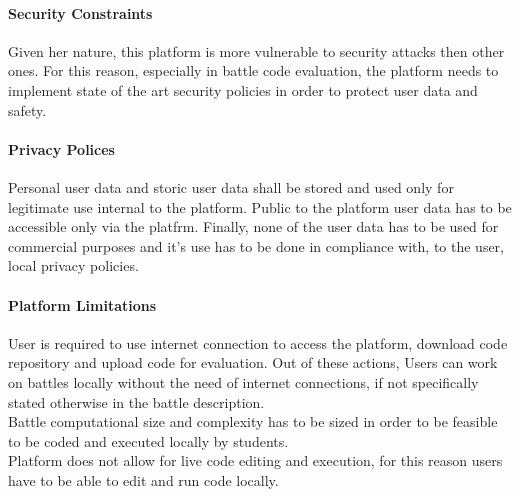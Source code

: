 \paragraph{Security Constraints}
Given her nature, this platform is more vulnerable to security attacks then other ones. For this reason, especially in battle code evaluation, the platform needs to implement state of the art security policies in order to protect user data and safety.
\paragraph{Privacy Polices}
Personal user data and storic user data shall be stored and used only for legitimate use internal to the platform. Public to the platform user data has to be accessible only via the platfrm. Finally, none of the user data has to be used for commercial purposes and it's use has to be done in compliance with, to the user, local privacy policies. 
\paragraph{Platform Limitations}
User is required to use internet connection to access the platform, download code repository and upload code for evaluation. Out of these actions, Users can work on battles locally without the need of internet connections, if not specifically stated otherwise in the battle description.\\
Battle computational size and complexity has to be sized in order to be feasible to be coded and executed locally by students.\\
Platform does not allow for live code editing and execution, for this reason users have to be able to edit and run code locally.
